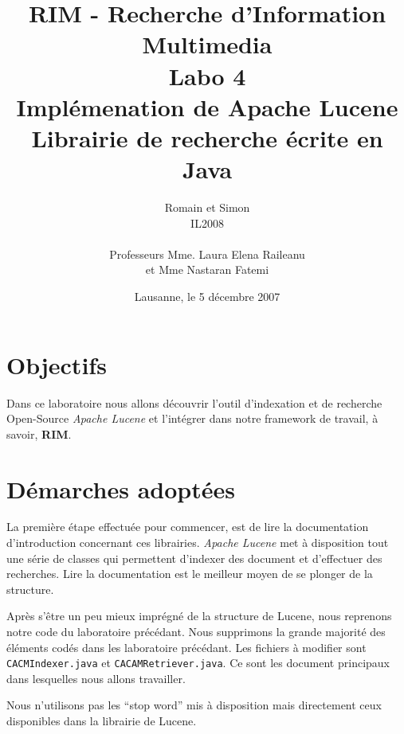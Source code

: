 \documentclass[a4paper, 11pt]{article}
\title{ %
\small{RIM - Recherche d'Information Multimedia} \\ \vspace{2cm}
\huge{Labo 4} \\ \vspace{1cm} 
Implémenation de Apache Lucene \\ 
\small{Librairie de recherche écrite en Java}}
\author{Romain \bsc{de Wolff} et Simon \bsc{Hintermann}\\ IL2008 \\ \vspace{2cm} \\ Professeurs Mme. Laura Elena Raileanu \\ et Mme Nastaran Fatemi \vspace{2cm} 
}
\date{Lausanne, le 5 décembre 2007}  %
\begin{document}
\maketitle
\thispagestyle{empty} %
\newpage
 \setcounter{page}{1} 

{\setlength{\baselineskip}{1.2\baselineskip}
\parskip=12pt
\section{Objectifs} 

Dans ce laboratoire nous allons découvrir l'outil d'indexation et de recherche Open-Source \emph{Apache Lucene} et l'intégrer dans notre framework de travail, à savoir, \textbf{RIM}.

\section{Démarches adoptées} 

La première étape effectuée pour commencer, est de lire la documentation d'introduction concernant ces librairies. \emph{Apache Lucene} met à disposition tout une série de classes qui permettent d'indexer des document et d'effectuer des recherches. Lire la documentation est le meilleur moyen de se plonger de la structure. 


Après s'être un peu mieux imprégné de la structure de Lucene, nous reprenons notre code du laboratoire précédant. Nous supprimons la grande majorité des éléments codés dans les laboratoire précédant. Les fichiers à modifier sont \texttt{CACMIndexer.java} et \texttt{CACAMRetriever.java}. Ce sont les document principaux dans lesquelles nous allons travailler.

Nous n'utilisons pas les “stop word” mis à disposition mais directement ceux disponibles dans la librairie de Lucene.

}
\end{document}
